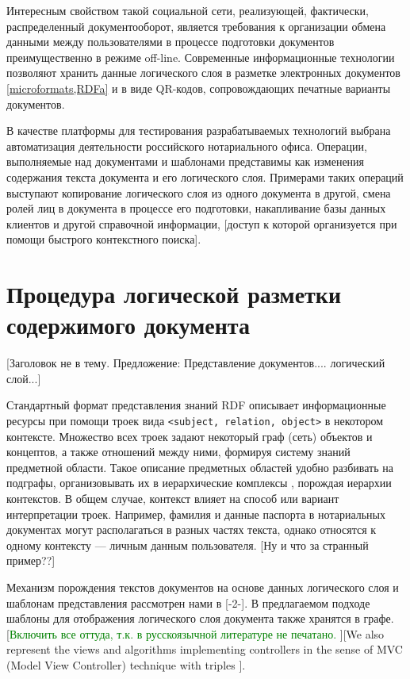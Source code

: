 \documentclass[utf8]{../IncArticle}
\newcommand{\e}[2][fcolor]{\textcolor{pcolor}{[}\textcolor{#1}{#2}\textcolor{pcolor}{]}}
\begin{document}
Интересным свойством такой социальной сети, реализующей, фактически,
распределенный документооборот, является требования к организации
обмена данными между пользователями в процессе подготовки документов
преимущественно в режиме off-line.  Современные информационные
технологии позволяют хранить данные логического слоя в разметке
электронных документов \ref{microformats,RDFa} и в виде QR-кодов,
сопровождающих печатные варианты документов.

В качестве платформы для тестирования разрабатываемых технологий
выбрана автоматизация деятельности российского нотариального
офиса.  Операции, выполняемые над документами и шаблонами представимы
как изменения содержания текста документа и его логического
слоя.  Примерами таких операций выступают копирование логического слоя
из одного документа в другой, смена ролей лиц в документа в процессе
его подготовки, накапливание базы данных клиентов и другой справочной
информации, \e{доступ к которой организуется при помощи быстрого
контекстного поиска}.

\section{Процедура логической разметки содержимого документа}
\e{Заголовок не в тему.  Предложение: Представление
  документов.... логический слой...}

Стандартный формат представления знаний RDF описывает информационные
ресурсы при помощи троек вида \texttt{<subject, relation, object>} в
некотором контексте.  Множество всех троек задают некоторый граф (сеть)
объектов и концептов, а также отношений между ними, формируя систему
знаний предметной области.  Такое описание предметных областей удобно
разбивать на подграфы, организовывать их в иерархические комплексы
\cite{b4}, порождая иерархии контекстов.  В общем случае, контекст
влияет на способ или вариант интерпретации троек.  Например, фамилия и
данные паспорта в нотариальных документах могут располагаться в разных
частях текста, однако относятся к одному контексту --- личным данным
пользователя.  \e{Ну и что за странный пример??}

Механизм порождения текстов документов на основе данных логического
слоя и шаблонам представления рассмотрен нами в [-2-].  В предлагаемом
подходе шаблоны для отображения логического слоя документа также
хранятся в графе.  \e[green]{Включить все оттуда, т.к. в русскоязычной
  литературе не печатано.  }\e{We also represent the views and
  algorithms implementing controllers in the sense of MVC (Model View
  Controller) technique with triples \cite{b5}}.
\end{document}
